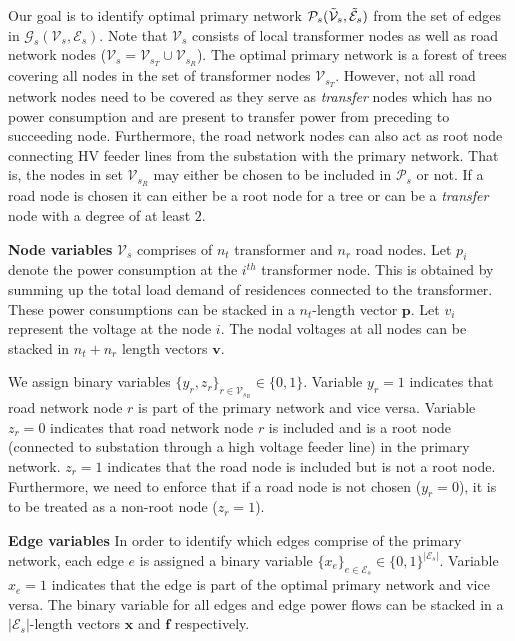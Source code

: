 \documentclass[sigconf]{acmart}
\begin{document}
Our goal is to identify optimal primary network $\mathcal{P}_s(\Tilde{\mathcal{V}}_s,\Tilde{\mathcal{E}}_s)$ from the set of edges in $\mathcal{G}_{s}(\mathcal{V}_s,\mathcal{E}_s)$. Note that $\mathcal{V}_s$ consists of local transformer nodes as well as road network nodes ($\mathcal{V}_s=\mathcal{V}_{s_T}\cup\mathcal{V}_{s_R}$). The optimal primary network is a forest of trees covering all nodes in the set of transformer nodes $\mathcal{V}_{s_T}$. However, not all road network nodes need to be covered as they serve as \emph{transfer} nodes which has no power consumption and are present to transfer power from preceding to succeeding node. Furthermore, the road network nodes can also act as root node connecting HV feeder lines from the substation with the primary network. That is, the nodes in set $\mathcal{V}_{s_R}$ may either be chosen to be included in $\mathcal{P}_s$ or not. If a road node is chosen it can either be a root node for a tree or can be a \emph{transfer} node with a degree of at least $2$.

\noindent\textbf{Node variables} $\mathcal{V}_s$ comprises of $n_t$ transformer and $n_r$ road nodes. Let $p_i$ denote the power consumption at the $i^{th}$ transformer node. This is obtained by summing up the total load demand of residences connected to the transformer. These power consumptions can be stacked in a $n_t$-length vector $\mathbf{p}$. Let $v_i$ represent the voltage at the node $i$. The nodal voltages at all nodes can be stacked in $n_t+n_r$ length vectors $\mathbf{v}$.

We assign binary variables $\{y_r,z_r\}_{r\in\mathcal{V}_{s_R}}\in\{0,1\}$. Variable $y_r=1$ indicates that road network node $r$ is part of the primary network and vice versa. Variable $z_r=0$ indicates that road network node $r$ is included and is a root node (connected to substation through a high voltage feeder line) in the primary network. $z_r=1$ indicates that the road node is included but is not a root node. Furthermore, we need to enforce that if a road node is not chosen ($y_r=0$), it is to be treated as a non-root node ($z_r=1$).

\noindent\textbf{Edge variables}
In order to identify which edges comprise of the primary network, each edge $e$ is assigned a binary variable $\{x_e\}_{e\in\mathcal{E}_s}\in\{0,1\}^{|\mathcal{E}_s|}$. Variable $x_e=1$ indicates that the edge is part of the optimal primary network and vice versa. The binary variable for all edges and edge power flows can be stacked in a $|\mathcal{E}_s|$-length vectors $\mathbf{x}$ and $\mathbf{f}$ respectively.
\end{document}

